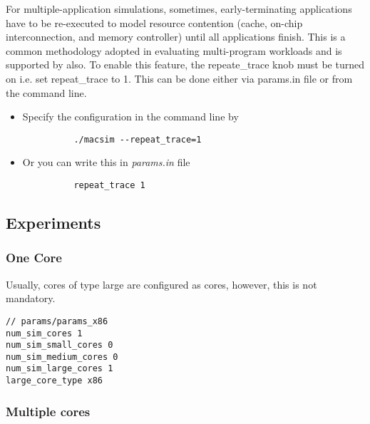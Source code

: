 For multiple-application simulations, sometimes, early-terminating applications
have to be re-executed to model resource contention (cache, on-chip
interconnection, and memory controller) until all applications finish. This
is a common methodology adopted in evaluating multi-program workloads and is
supported by \SIM also. To enable this feature, the repeate\_trace knob must be
turned on i.e. set repeat\_trace to 1. This can be done either via params.in
file or from the command line. 

\ignore
		{
		\begin{itemize}
		  \item Specify the configuration in the command line by
		  \begin{Verbatim}
		  ./macsim --repeat_trace=1
		  \end{Verbatim}

		  \item Or you can write this in \textit{params.in} file
		  \begin{Verbatim}
		  repeat_trace 1
		  \end{Verbatim}
		\end{itemize}
		}



\subsection{\cpu Experiments}


\subsubsection{One \cpu Core}

Usually, cores of type large are configured as \cpu cores, however, this is not
mandatory. 

\begin{Verbatim}
// params/params_x86
num_sim_cores 1
num_sim_small_cores 0
num_sim_medium_cores 0
num_sim_large_cores 1
large_core_type x86
\end{Verbatim}


\subsubsection{Multiple \cpu cores}

